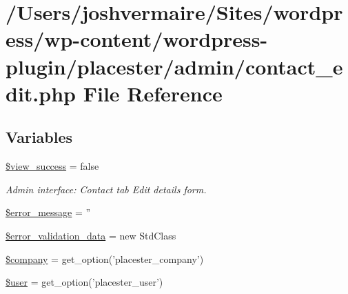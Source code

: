 \hypertarget{contact__edit_8php}{
\section{/Users/joshvermaire/Sites/wordpress/wp-\/content/wordpress-\/plugin/placester/admin/contact\_\-edit.php File Reference}
\label{de/d4d/contact__edit_8php}
}
\subsection*{Variables}
\begin{DoxyCompactItemize}
\item 
\hyperlink{contact__edit_8php_abb388ebff52ac480d577be234950bbf6}{\$view\_\-success} = false
\begin{DoxyCompactList}\small\item\em Admin interface: Contact tab Edit details form. \end{DoxyCompactList}\item 
\hyperlink{contact__edit_8php_ae838cbd355959defbd4d49d0fbe7b273}{\$error\_\-message} = ''
\item 
\hyperlink{contact__edit_8php_ae9bd679c49b80e9f12a3c0c90ff0e5c3}{\$error\_\-validation\_\-data} = new StdClass
\item 
\hyperlink{contact__edit_8php_a3306bb3d7f99fc57bee9e96f928769d4}{\$company} = get\_\-option('placester\_\-company')
\item 
\hyperlink{contact__edit_8php_a598ca4e71b15a1313ec95f0df1027ca5}{\$user} = get\_\-option('placester\_\-user')
\end{DoxyCompactItemize}



